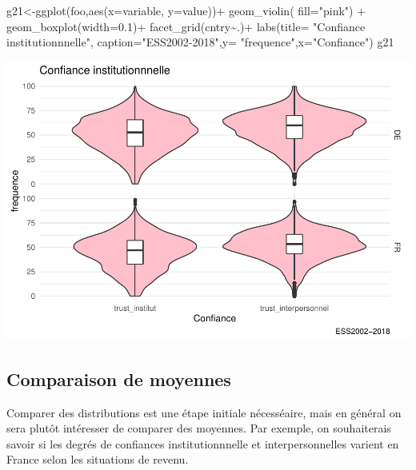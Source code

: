 \documentclass[
]{book}
\newenvironment{Shaded}{\begin{snugshade}}{\end{snugshade}}
\newcommand{\AttributeTok}[1]{\textcolor[rgb]{0.77,0.63,0.00}{#1}}
\newcommand{\FloatTok}[1]{\textcolor[rgb]{0.00,0.00,0.81}{#1}}
\newcommand{\FunctionTok}[1]{\textcolor[rgb]{0.00,0.00,0.00}{#1}}
\newcommand{\NormalTok}[1]{#1}
\newcommand{\OtherTok}[1]{\textcolor[rgb]{0.56,0.35,0.01}{#1}}
\newcommand{\SpecialCharTok}[1]{\textcolor[rgb]{0.00,0.00,0.00}{#1}}
\newcommand{\StringTok}[1]{\textcolor[rgb]{0.31,0.60,0.02}{#1}}
\begin{document}
\begin{Shaded}
\begin{Highlighting}[]
\NormalTok{g21}\OtherTok{\textless{}{-}}\FunctionTok{ggplot}\NormalTok{(foo,}\FunctionTok{aes}\NormalTok{(}\AttributeTok{x=}\NormalTok{variable, }\AttributeTok{y=}\NormalTok{value))}\SpecialCharTok{+} 
  \FunctionTok{geom\_violin}\NormalTok{( }\AttributeTok{fill=}\StringTok{"pink"}\NormalTok{) }\SpecialCharTok{+} 
  \FunctionTok{geom\_boxplot}\NormalTok{(}\AttributeTok{width=}\FloatTok{0.1}\NormalTok{)}\SpecialCharTok{+}
  \FunctionTok{facet\_grid}\NormalTok{(cntry}\SpecialCharTok{\textasciitilde{}}\NormalTok{.)}\SpecialCharTok{+}   
  \FunctionTok{labs}\NormalTok{(}\AttributeTok{title=} \StringTok{"Confiance institutionnnelle"}\NormalTok{, }\AttributeTok{caption=}\StringTok{"ESS2002{-}2018"}\NormalTok{,}\AttributeTok{y=} \StringTok{"frequence"}\NormalTok{,}\AttributeTok{x=}\StringTok{"Confiance"}\NormalTok{)}
\NormalTok{g21}
\end{Highlighting}
\end{Shaded}

\includegraphics{bookdown-demo_files/figure-latex/418-2.pdf}

\hypertarget{comparaison-de-moyennes}{%
\subsection{Comparaison de moyennes}\label{comparaison-de-moyennes}}

Comparer des distributions est une étape initiale nécesséaire, mais en général on sera plutôt intéresser de comparer des moyennes. Par exemple, on souhaiterais savoir si les degrés de confiances institutionnnelle et interpersonnelles varient en France selon les situations de revenu.
\end{document}
